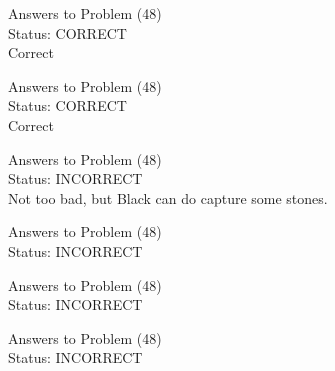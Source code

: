 \documentclass[11pt]{article}
\begin{document}
\begin{minipage}[t]{0.5\textwidth}
  {\centering
  
  Answers to Problem (48)\\
  Status: CORRECT\\
  Correct\\
  }
\end{minipage}
\begin{minipage}[t]{0.5\textwidth}
  {\centering
  
  Answers to Problem (48)\\
  Status: CORRECT\\
  Correct\\
  }
\end{minipage}
\begin{minipage}[t]{0.5\textwidth}
  {\centering
  
  Answers to Problem (48)\\
  Status: INCORRECT\\
  Not too bad, but Black can do capture some stones.\\
  }
\end{minipage}
\begin{minipage}[t]{0.5\textwidth}
  {\centering
  
  Answers to Problem (48)\\
  Status: INCORRECT\\
  
  }
\end{minipage}
\begin{minipage}[t]{0.5\textwidth}
  {\centering
  
  Answers to Problem (48)\\
  Status: INCORRECT\\
  
  }
\end{minipage}
\begin{minipage}[t]{0.5\textwidth}
  {\centering
  
  Answers to Problem (48)\\
  Status: INCORRECT\\
  
  }
\end{minipage}
\end{document}
